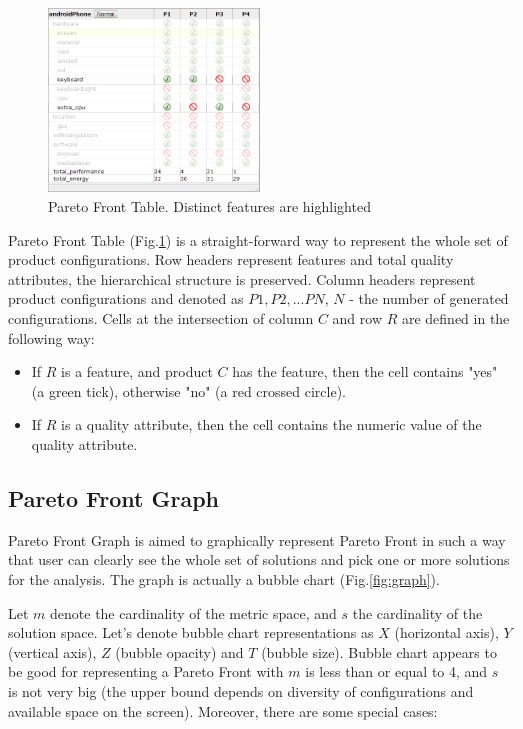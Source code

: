 \documentclass{acm_proc_article-sp}
\begin{document}
\begin{figure}[h]
\includegraphics[width=0.5\textwidth]{table.png}
\caption{Pareto Front Table. Distinct features are highlighted}    
  \label{fig:table}
\end{figure}

Pareto Front Table (Fig.\ref{fig:table}) is a straight-forward way to represent the whole set of product configurations. Row headers represent features and total quality attributes, the hierarchical structure is preserved. Column headers represent product configurations and denoted as $P1, P2, ... PN$, $N$ - the number of generated configurations. Cells at the intersection of column $C$ and row $R$ are defined in the following way:
\begin{itemize}
\item If $R$ is a feature, and product $C$ has the feature, then the cell contains "yes" (a green tick), otherwise "no" (a red crossed circle).
\item If $R$ is a quality attribute, then the cell contains the numeric value of the quality attribute.
\end{itemize}

\subsection{Pareto Front Graph}

Pareto Front Graph is aimed to graphically represent Pareto Front in such a way that user can clearly see the whole set of solutions and pick one or more solutions for the analysis. The graph is actually a bubble chart  (Fig.\ref{fig:graph}).

Let $m$ denote the cardinality of the metric space, and $s$ the cardinality of the solution space. Let's denote bubble chart representations as $X$ (horizontal axis), $Y$ (vertical axis), $Z$ (bubble opacity) and $T$ (bubble size). 
Bubble chart appears to be good for representing a Pareto Front with $m$ is less than or equal to 4, and $s$ is not very big (the upper bound depends on diversity of configurations and available space on the screen). Moreover, there are some special cases:
\end{document}
